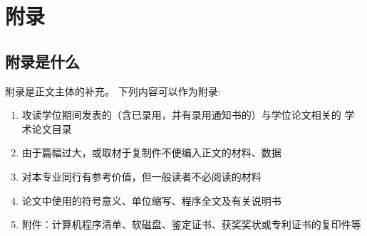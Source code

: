 
\chapter{附录}

\section{附录是什么}
\Verbatiminput{}
附录是正文主体的补充。
下列内容可以作为附录:
\begin{enumerate}
\item 攻读学位期间发表的（含已录用，并有录用通知书的）与学位论文相关的
	学术论文目录
\item 由于篇幅过大，或取材于复制件不便编入正文的材料、数据
\item 对本专业同行有参考价值，但一般读者不必阅读的材料
\item 论文中使用的符号意义、单位缩写、程序全文及有关说明书
\item 附件：计算机程序清单、软磁盘、鉴定证书、获奖奖状或专利证书的复印件等
\end{enumerate}
